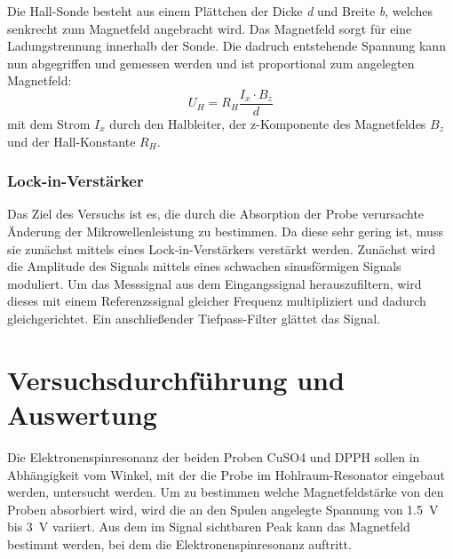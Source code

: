 \documentclass{scrartcl}
\begin{document}
Die Hall-Sonde besteht aus einem Plättchen der Dicke \textit{d} und Breite \textit{b}, welches senkrecht zum Magnetfeld angebracht wird. Das Magnetfeld sorgt für eine Ladungstrennung innerhalb der Sonde. Die dadruch entstehende Spannung kann nun abgegriffen und gemessen werden und ist proportional zum angelegten Magnetfeld:
\begin{equation}
    U_H = R_H \frac{I_x \cdot B_z}{d}
    \label{Hallspannung}
\end{equation}
mit dem Strom $I_x$ durch den Halbleiter, der z-Komponente des Magnetfeldes $B_z$ und der Hall-Konstante $R_H$.

\subsubsection{Lock-in-Verstärker}
Das Ziel des Versuchs ist es, die durch die Absorption der Probe verursachte Änderung der Mikrowellenleistung zu bestimmen. Da diese sehr gering ist, muss sie zunächst mittels eines Lock-in-Verstärkers verstärkt werden. Zunächst wird die Amplitude des Signals mittels eines schwachen sinusförmigen Signals moduliert. Um das Messsignal aus dem Eingangssignal herauszufiltern, wird dieses mit einem Referenzssignal gleicher Frequenz multipliziert und dadurch gleichgerichtet. Ein anschließender Tiefpass-Filter glättet das Signal.



\section{Versuchsdurchführung und Auswertung}
Die Elektronenspinresonanz der beiden Proben CuSO4 und DPPH sollen in Abhängigkeit vom Winkel, mit der die Probe im Hohlraum-Resonator eingebaut werden, untersucht werden. Um zu bestimmen welche Magnetfeldstärke von den Proben absorbiert wird, wird die an den Spulen angelegte Spannung von \SI{1.5}{V} bis \SI{3}{V} variiert. Aus dem im Signal sichtbaren Peak kann das Magnetfeld bestimmt werden, bei dem die Elektronenspinresonanz auftritt. 
\end{document}
